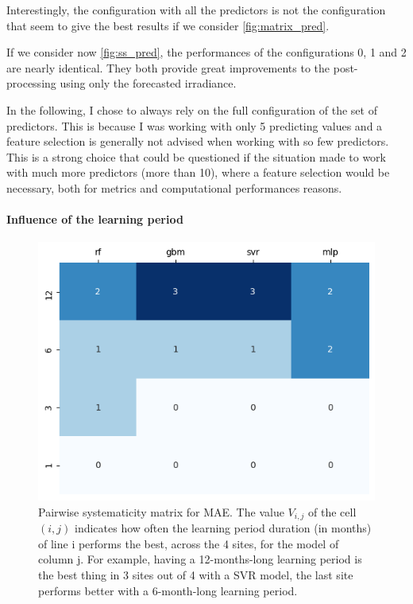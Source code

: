 Interestingly, the configuration with all the predictors is not the configuration that seem to give the best results if we consider \autoref{fig:matrix_pred}.

If we consider now \ref{fig:ss_pred}, the performances of the configurations 0, 1 and 2 are nearly identical. They both provide great improvements to the post-processing using only the forecasted irradiance.

In the following, I chose to always rely on the full configuration of the set of predictors. This is because I was working with only 5 predicting values and a feature selection is generally not advised when working with so few predictors.
This is a strong choice that could be questioned if the situation made to work with much more predictors (more than 10), where a feature selection would be necessary, both for metrics and computational performances reasons.
\paragraph{Influence of the learning period}

\begin{figure}[htb!]
    \centering
    \includegraphics[width=\columnwidth]{figures/first_study/comp_learning_period_mae.png}
\caption{Pairwise systematicity matrix for MAE. The value $V_{i,j}$ of the cell $(i,j)$ indicates how often the learning period duration (in months) of line i performs the best, across the 4 sites, for the model of column j. For example, having a 12-months-long learning period is the best thing in 3 sites out of 4 with a SVR model, the last site performs better with a 6-month-long learning period.}
\label{fig:matrix_period}
\end{figure}

